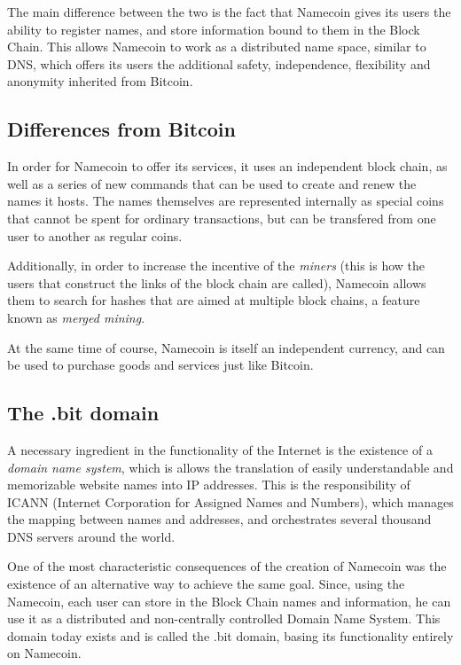 \documentclass[journal]{IEEEtran}
\begin{document}
The main difference between the two is the fact that Namecoin gives its users the ability to
register names, and store information bound to them in the Block Chain. This allows Namecoin
to work as a distributed name space, similar to DNS, which offers its users the additional
safety, independence, flexibility and anonymity inherited from Bitcoin.

\subsection{Differences from Bitcoin}

In order for Namecoin to offer its services, it uses an independent block chain, as well as
a series of new commands that can be used to create and renew the names it hosts.
The names themselves are represented internally as special coins that cannot be spent
for ordinary transactions, but can be transfered from one user to another as regular coins.

Additionally, in order to increase the incentive of the \textit{miners} (this is how the
users that construct the links of the block chain are called), Namecoin allows them to
search for hashes that are aimed at multiple block chains, a feature known as \textit{merged
mining}.

At the same time of course, Namecoin is itself an independent currency, and can be used to
purchase goods and services just like Bitcoin.

\subsection{The .bit domain}

A necessary ingredient in the functionality of the Internet is the existence of a \textit{domain
name system}, which is allows the translation of easily understandable and memorizable website
names into IP addresses. This is the responsibility of ICANN (Internet Corporation
for Assigned Names and Numbers), which manages the mapping between names and addresses, and
orchestrates several thousand DNS servers around the world.

One of the most characteristic consequences of the creation of Namecoin was the existence of
an alternative way to achieve the same goal. Since, using the Namecoin, each user can store
in the Block Chain names and information, he can use it as a distributed and non-centrally
controlled Domain Name System. This domain today exists and is called the .bit domain,
basing its functionality entirely on Namecoin.
\end{document}

